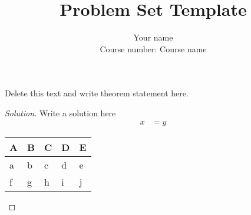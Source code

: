 \documentclass[10pt]{article}
\newenvironment{problem}[2][Problem]{\begin{trivlist}
\item[\hskip \labelsep {\bfseries #1}\hskip \labelsep {\bfseries #2.}]}{\end{trivlist}}
\begin{document}
 
\title{Problem Set Template}
\author{Your name\\
Course number: Course name}
\maketitle
 
\begin{problem}{1.1}
Delete this text and write theorem statement here.
\end{problem}

\begin{proof}[Solution]
Write a solution here
\begin{align*}
x &= y
\end{align*}
\begin{tabular}{| >{\centering\arraybackslash}m{1in} | >{\centering\arraybackslash}m{1in} | >{\centering\arraybackslash}m{1in} | >{\centering\arraybackslash}m{1in} |>{\centering\arraybackslash}m{1in} |}
\hline 
  \textbf{A} & \textbf{B} & \textbf{C} & \textbf{D} &\textbf{E} \\[8pt]
  \hline
  a & b & c & d & e \\[8pt]
  \hline
  f & g &h & i & j \\[8pt]
  \hline
\end{tabular}
\end{proof}
\end{document}
